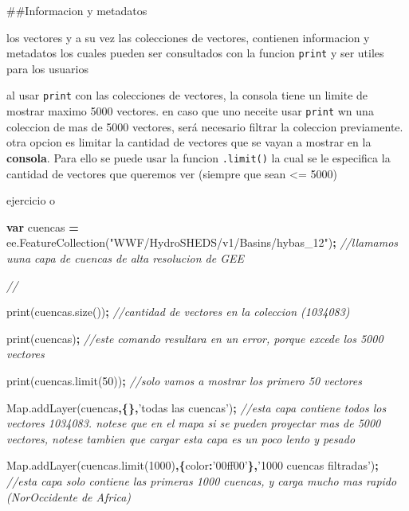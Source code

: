 \documentclass[
]{article}
\newenvironment{Shaded}{\begin{snugshade}}{\end{snugshade}}
\newcommand{\AttributeTok}[1]{\textcolor[rgb]{0.77,0.63,0.00}{#1}}
\newcommand{\CommentTok}[1]{\textcolor[rgb]{0.56,0.35,0.01}{\textit{#1}}}
\newcommand{\DataTypeTok}[1]{\textcolor[rgb]{0.13,0.29,0.53}{#1}}
\newcommand{\DecValTok}[1]{\textcolor[rgb]{0.00,0.00,0.81}{#1}}
\newcommand{\KeywordTok}[1]{\textcolor[rgb]{0.13,0.29,0.53}{\textbf{#1}}}
\newcommand{\NormalTok}[1]{#1}
\newcommand{\OperatorTok}[1]{\textcolor[rgb]{0.81,0.36,0.00}{\textbf{#1}}}
\newcommand{\StringTok}[1]{\textcolor[rgb]{0.31,0.60,0.02}{#1}}
\newcommand{\VariableTok}[1]{\textcolor[rgb]{0.00,0.00,0.00}{#1}}
\begin{document}
\#\#Informacion y metadatos

los vectores y a su vez las colecciones de vectores, contienen
informacion y metadatos los cuales pueden ser consultados con la funcion
\texttt{print} y ser utiles para los usuarios

\begin{tipblock}

al usar \texttt{print} con las colecciones de vectores, la consola tiene
un limite de mostrar maximo 5000 vectores. en caso que uno neceite usar
\texttt{print} wn una coleccion de mas de 5000 vectores, será necesario
filtrar la coleccion previamente. otra opcion es limitar la cantidad de
vectores que se vayan a mostrar en la \textbf{consola}. Para ello se
puede usar la funcion \texttt{.limit()} la cual se le especifica la
cantidad de vectores que queremos ver (siempre que sean \textless= 5000)

ejercicio o

\begin{Shaded}
\begin{Highlighting}[]

\KeywordTok{var}\NormalTok{ cuencas }\OperatorTok{=} \VariableTok{ee}\NormalTok{.}\AttributeTok{FeatureCollection}\NormalTok{(}\StringTok{"WWF/HydroSHEDS/v1/Basins/hybas_12"}\NormalTok{)}\OperatorTok{;} \CommentTok{//llamamos uuna capa de cuencas de alta resolucion de GEE}

\CommentTok{// }

\AttributeTok{print}\NormalTok{(}\VariableTok{cuencas}\NormalTok{.}\AttributeTok{size}\NormalTok{())}\OperatorTok{;}  \CommentTok{//cantidad de vectores en la coleccion (1034083)}

\AttributeTok{print}\NormalTok{(cuencas)}\OperatorTok{;} \CommentTok{//este comando resultara en un error, porque excede los 5000 vectores}

\AttributeTok{print}\NormalTok{(}\VariableTok{cuencas}\NormalTok{.}\AttributeTok{limit}\NormalTok{(}\DecValTok{50}\NormalTok{))}\OperatorTok{;} \CommentTok{//solo vamos a mostrar los primero 50 vectores}

\VariableTok{Map}\NormalTok{.}\AttributeTok{addLayer}\NormalTok{(cuencas}\OperatorTok{,\{\},}\StringTok{'todas las cuencas'}\NormalTok{)}\OperatorTok{;} \CommentTok{//esta capa contiene todos los vectores 1034083. notese que en el mapa si se pueden proyectar mas de 5000 vectores, notese tambien que cargar esta capa es un poco lento y pesado}

\VariableTok{Map}\NormalTok{.}\AttributeTok{addLayer}\NormalTok{(}\VariableTok{cuencas}\NormalTok{.}\AttributeTok{limit}\NormalTok{(}\DecValTok{1000}\NormalTok{)}\OperatorTok{,\{}\DataTypeTok{color}\OperatorTok{:}\StringTok{'00ff00'}\OperatorTok{\},}\StringTok{'1000 cuencas filtradas'}\NormalTok{)}\OperatorTok{;} \CommentTok{//esta capa solo contiene las primeras 1000 cuencas, y carga mucho mas rapido (NorOccidente de Africa)}
\end{Highlighting}
\end{Shaded}


\end{tipblock}
\end{document}
